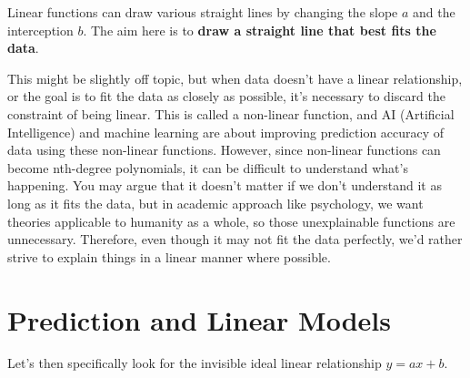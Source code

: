 \documentclass{ltjbook}
\begin{document}
Linear functions can draw various straight lines by changing the slope $a$ and the interception $b$. The aim here is to \textbf{draw a straight line that best fits the data}.

This might be slightly off topic, but when data doesn't have a linear relationship, or the goal is to fit the data as closely as possible, it's necessary to discard the constraint of being linear. This is called a non-linear function, and AI (Artificial Intelligence) and machine learning are about improving prediction accuracy of data using these non-linear functions. However, since non-linear functions can become nth-degree polynomials, it can be difficult to understand what's happening. You may argue that it doesn't matter if we don't understand it as long as it fits the data, but in academic approach like psychology, we want theories applicable to humanity as a whole, so those unexplainable functions are unnecessary. Therefore, even though it may not fit the data perfectly, we'd rather strive to explain things in a linear manner where possible.

\section{Prediction and Linear Models}

Let's then specifically look for the invisible ideal linear relationship $y=ax+b$.
\end{document}
